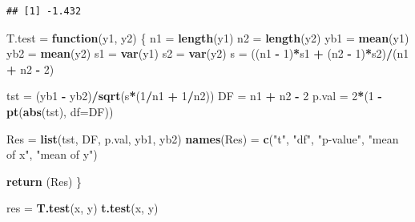 \documentclass[10pt,]{krantz}
\makeatletter
\newenvironment{Shaded}{\begin{snugshade}}{\end{snugshade}}
\newcommand{\KeywordTok}[1]{\textcolor[rgb]{0.13,0.29,0.53}{\textbf{#1}}}
\newcommand{\DataTypeTok}[1]{\textcolor[rgb]{0.13,0.29,0.53}{#1}}
\newcommand{\DecValTok}[1]{\textcolor[rgb]{0.00,0.00,0.81}{#1}}
\newcommand{\StringTok}[1]{\textcolor[rgb]{0.31,0.60,0.02}{#1}}
\newcommand{\ControlFlowTok}[1]{\textcolor[rgb]{0.13,0.29,0.53}{\textbf{#1}}}
\newcommand{\OperatorTok}[1]{\textcolor[rgb]{0.81,0.36,0.00}{\textbf{#1}}}
\newcommand{\NormalTok}[1]{#1}
\newenvironment{kframe}{%
\medskip{}
\setlength{\fboxsep}{.8em}
 \def\at@end@of@kframe{}%
 \ifinner\ifhmode%
  \def\at@end@of@kframe{\end{minipage}}%
  \begin{minipage}{\columnwidth}%
 \fi\fi%
 \def\FrameCommand##1{\hskip\@totalleftmargin \hskip-\fboxsep
 \colorbox{shadecolor}{##1}\hskip-\fboxsep
     \hskip-\linewidth \hskip-\@totalleftmargin \hskip\columnwidth}%
 \MakeFramed {\advance\hsize-\width
   \@totalleftmargin\z@ \linewidth\hsize
   \@setminipage}}%
 {\par\unskip\endMakeFramed%
 \at@end@of@kframe}
\renewenvironment{Shaded}{\begin{kframe}}{\end{kframe}}
\makeatother
\begin{document}
\begin{verbatim}
## [1] -1.432
\end{verbatim}

\begin{Shaded}
\begin{Highlighting}[]
\NormalTok{T.test =}\StringTok{ }\ControlFlowTok{function}\NormalTok{(y1, y2) }
\NormalTok{\{}
\NormalTok{  n1  =}\StringTok{ }\KeywordTok{length}\NormalTok{(y1)}
\NormalTok{  n2  =}\StringTok{ }\KeywordTok{length}\NormalTok{(y2)}
\NormalTok{  yb1 =}\StringTok{ }\KeywordTok{mean}\NormalTok{(y1)}
\NormalTok{  yb2 =}\StringTok{ }\KeywordTok{mean}\NormalTok{(y2)}
\NormalTok{  s1  =}\StringTok{ }\KeywordTok{var}\NormalTok{(y1)}
\NormalTok{  s2  =}\StringTok{ }\KeywordTok{var}\NormalTok{(y2) }
\NormalTok{  s   =}\StringTok{ }\NormalTok{((n1 }\OperatorTok{-}\StringTok{ }\DecValTok{1}\NormalTok{)}\OperatorTok{*}\NormalTok{s1 }\OperatorTok{+}\StringTok{ }\NormalTok{(n2 }\OperatorTok{-}\StringTok{ }\DecValTok{1}\NormalTok{)}\OperatorTok{*}\NormalTok{s2)}\OperatorTok{/}\NormalTok{(n1 }\OperatorTok{+}\StringTok{ }\NormalTok{n2 }\OperatorTok{-}\StringTok{ }\DecValTok{2}\NormalTok{)}

\NormalTok{  tst =}\StringTok{ }\NormalTok{(yb1 }\OperatorTok{-}\StringTok{ }\NormalTok{yb2)}\OperatorTok{/}\KeywordTok{sqrt}\NormalTok{(s}\OperatorTok{*}\NormalTok{(}\DecValTok{1}\OperatorTok{/}\NormalTok{n1 }\OperatorTok{+}\StringTok{ }\DecValTok{1}\OperatorTok{/}\NormalTok{n2))}
\NormalTok{  DF =}\StringTok{ }\NormalTok{n1 }\OperatorTok{+}\StringTok{ }\NormalTok{n2 }\OperatorTok{-}\StringTok{ }\DecValTok{2}
\NormalTok{  p.val =}\StringTok{ }\DecValTok{2}\OperatorTok{*}\NormalTok{(}\DecValTok{1} \OperatorTok{-}\StringTok{ }\KeywordTok{pt}\NormalTok{(}\KeywordTok{abs}\NormalTok{(tst), }\DataTypeTok{df=}\NormalTok{DF))}
  
\NormalTok{  Res =}\StringTok{ }\KeywordTok{list}\NormalTok{(tst, DF, p.val, yb1, yb2)}
  \KeywordTok{names}\NormalTok{(Res) =}\StringTok{ }\KeywordTok{c}\NormalTok{(}\StringTok{"t"}\NormalTok{, }\StringTok{"df"}\NormalTok{, }\StringTok{"p-value"}\NormalTok{, }\StringTok{"mean of x"}\NormalTok{, }\StringTok{"mean of y"}\NormalTok{)}
  
  \KeywordTok{return}\NormalTok{ (Res)}
\NormalTok{\}}

\NormalTok{res =}\StringTok{ }\KeywordTok{T.test}\NormalTok{(x, y)}
\KeywordTok{t.test}\NormalTok{(x, y)}
\end{Highlighting}
\end{Shaded}
\end{document}
